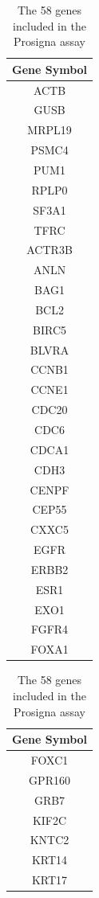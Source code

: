 \begin{table}[!htb]
  \caption{The 58 genes included in the Prosigna assay \citep{DUFFY2017284}}
  \centering
  \begin{tabular}{|c|}
  \hline
    \textbf{Gene Symbol} \\ 
\hline
ACTB \\
\hline
GUSB \\ 
\hline
MRPL19 \\
\hline
PSMC4 \\ 
\hline
PUM1 \\
\hline
RPLP0  \\
\hline
SF3A1 \\
\hline
TFRC \\
\hline
ACTR3B \\
\hline
ANLN \\
\hline
BAG1 \\
\hline
BCL2 \\
\hline 
BIRC5 \\ 
\hline
BLVRA \\
\hline
CCNB1 \\
\hline
CCNE1 \\
\hline
CDC20 \\ 
\hline
CDC6 \\ 
\hline
CDCA1 \\ 
\hline
CDH3 \\ 
\hline
CENPF \\ 
\hline
CEP55 \\
\hline
CXXC5 \\
\hline
EGFR \\
\hline 
ERBB2 \\
\hline 
ESR1 \\
\hline 
EXO1 \\ 
\hline
FGFR4 \\ 
\hline
FOXA1 \\ 
\hline
  \end{tabular}
  \hspace{1em}
  \begin{tabular}{|c|}
  \hline
   \textbf{Gene Symbol} \\ 
\hline
FOXC1 \\ 
\hline
GPR160 \\
\hline 
GRB7 \\ 
\hline
KIF2C \\ 
\hline
KNTC2  \\
\hline
KRT14 \\ 
\hline 
KRT17 \\ 
\hline 

\end{tabular}
\end{table}
